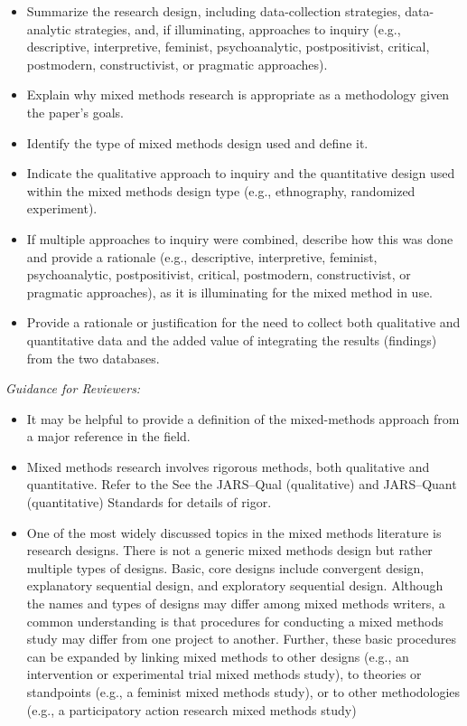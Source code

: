 \documentclass[acmsmall,screen,anonymous,review]{acmart}
\begin{document}
\begin{itemize}
\item Summarize the research design, including data-collection strategies, data-analytic strategies, and, if illuminating, approaches to inquiry (e.g., descriptive, interpretive, feminist, psychoanalytic, postpositivist, critical, postmodern, constructivist, or pragmatic approaches). 
\item Explain why mixed methods research is appropriate as a methodology given the paper’s goals. 
\item Identify the type of mixed methods design used and define it. 
\item Indicate the qualitative approach to inquiry and the quantitative design used within the mixed methods design type (e.g., ethnography, randomized experiment). 
\item If multiple approaches to inquiry were combined, describe how this was done and provide a rationale (e.g., descriptive, interpretive, feminist, psychoanalytic, postpositivist, critical, postmodern, constructivist, or pragmatic approaches), as it is illuminating for the mixed method in use. 
\item Provide a rationale or justification for the need to collect both qualitative and quantitative data and the added value of integrating the results (findings) from the two databases. 
\end{itemize}

\textit{Guidance for Reviewers:}
\begin{itemize}
\item It may be helpful to provide a definition of the mixed-methods approach from a major reference in the field. 
\item Mixed methods research involves rigorous methods, both qualitative and quantitative. Refer to the See the JARS–Qual (qualitative) and JARS–Quant (quantitative) Standards for details of rigor.
\item One of the most widely discussed topics in the mixed methods literature is research designs. There is not a generic mixed methods design but rather multiple types of designs. Basic, core designs include convergent design, explanatory sequential design, and exploratory sequential design. Although the names and types of designs may differ among mixed methods writers, a common understanding is that procedures for conducting a mixed methods study may differ from one project to another. Further, these basic procedures can be expanded by linking mixed methods to other designs (e.g., an intervention or experimental trial mixed methods study), to theories or standpoints (e.g., a feminist mixed methods study), or to other methodologies (e.g., a participatory action research mixed methods study)
\end{itemize}
\end{document}

